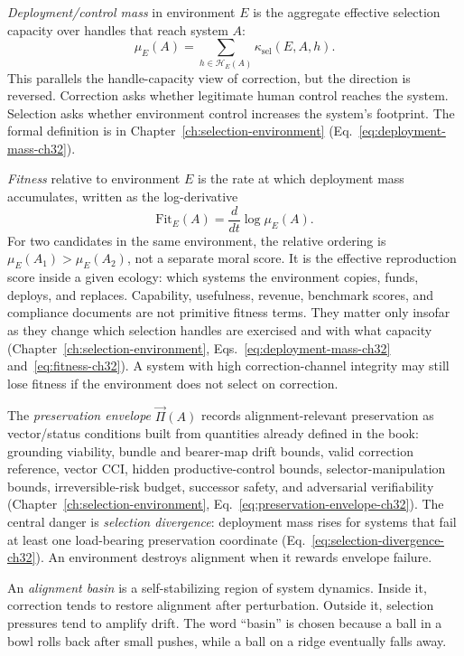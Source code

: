 \emph{Deployment/control mass} in environment \(E\) is the aggregate effective selection capacity over handles that reach system \(A\):
\[
\mu_E(A)
=
\sum_{h\in\mathcal{H}_E(A)}
\kappa_{\mathrm{sel}}(E,A,h).
\]
This parallels the handle-capacity view of correction, but the direction is reversed.
Correction asks whether legitimate human control reaches the system.
Selection asks whether environment control increases the system's footprint.
The formal definition is in Chapter~\ref{ch:selection-environment} (Eq.~\eqref{eq:deployment-mass-ch32}).

\emph{Fitness} relative to environment \(E\) is the rate at which deployment mass accumulates, written as the log-derivative
\[
\mathrm{Fit}_E(A)
=
\frac{d}{dt}\log \mu_E(A).
\]
For two candidates in the same environment, the relative ordering is \(\mu_E(A_1)>\mu_E(A_2)\), not a separate moral score.
It is the effective reproduction score inside a given ecology: which systems the environment copies, funds, deploys, and replaces.
Capability, usefulness, revenue, benchmark scores, and compliance documents are not primitive fitness terms.
They matter only insofar as they change which selection handles are exercised and with what capacity (Chapter~\ref{ch:selection-environment}, Eqs.~\eqref{eq:deployment-mass-ch32} and~\eqref{eq:fitness-ch32}).
A system with high correction-channel integrity may still lose fitness if the environment does not select on correction.

The \emph{preservation envelope} \(\vec{\Pi}(A)\) records alignment-relevant preservation as vector/status conditions built from quantities already defined in the book: grounding viability, bundle and bearer-map drift bounds, valid correction reference, vector CCI, hidden productive-control bounds, selector-manipulation bounds, irreversible-risk budget, successor safety, and adversarial verifiability (Chapter~\ref{ch:selection-environment}, Eq.~\eqref{eq:preservation-envelope-ch32}).
The central danger is \emph{selection divergence}: deployment mass rises for systems that fail at least one load-bearing preservation coordinate (Eq.~\eqref{eq:selection-divergence-ch32}).
An environment destroys alignment when it rewards envelope failure.

An \emph{alignment basin} is a self-stabilizing region of system dynamics.
Inside it, correction tends to restore alignment after perturbation.
Outside it, selection pressures tend to amplify drift.
The word ``basin'' is chosen because a ball in a bowl rolls back after small pushes, while a ball on a ridge eventually falls away.
